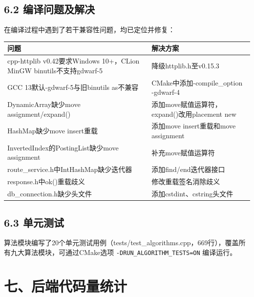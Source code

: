 \documentclass[12pt,a4paper]{article}
\begin{document}
\subsection*{6.2 编译问题及解决}

在编译过程中遇到了若干兼容性问题，均已定位并修复：

\begin{center}
\begin{tabular}{p{4.5cm} p{7cm}}
    \toprule
    \bfseries 问题 & \bfseries 解决方案 \\
    \midrule
    cpp-httplib v0.42要求Windows 10+，CLion MinGW binutils不支持gdwarf-5 & 降级httplib.h至v0.15.3 \\
    GCC 13默认-gdwarf-5与旧binutils as不兼容 & CMake中添加-compile\_option -gdwarf-4 \\
    DynamicArray缺少move assignment/expand() & 添加move赋值运算符，expand()改用placement new \\
    HashMap缺少move insert重载 & 添加move insert重载和move assignment \\
    InvertedIndex的PostingList缺少move assignment & 补充move赋值运算符 \\
    route\_service.h中IntHashMap缺少迭代器 & 添加find/end迭代器接口 \\
    response.h中ok()重载歧义 & 修改重载签名消除歧义 \\
    db\_connection.h缺少头文件 & 添加cstdint、cstring头文件 \\
    \bottomrule
\end{tabular}
\end{center}

\subsection*{6.3 单元测试}

算法模块编写了20个单元测试用例（tests/test\_algorithms.cpp，669行），覆盖所有九大算法模块，可通过CMake选项 \texttt{-DRUN\_ALGORITHM\_TESTS=ON} 编译运行。

\section*{七、后端代码量统计}
\end{document}
